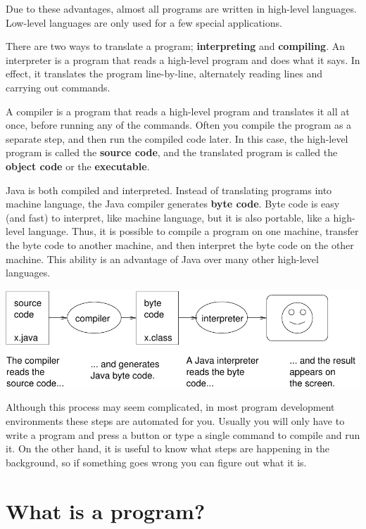 \documentclass[12pt]{book}
\theoremstyle{exercise}
\begin{document}
Due to these advantages, almost all programs are written in
high-level languages.  Low-level languages are only used for
a few special applications.


There are two ways to translate a program;
{\bf interpreting} and {\bf compiling}.  An interpreter
is a program that reads a high-level program
and does what it says.  In effect, it translates
the program line-by-line, alternately reading lines and
carrying out commands.

A compiler is a program that reads a high-level program and
translates it all at once, before running any of the commands.
Often you compile the program as a separate step, and then
run the compiled code later.  In this case, the high-level
program is called the {\bf source code}, and the translated
program is called the {\bf object code} or the {\bf executable}.

Java is both compiled and
interpreted.  Instead of translating programs into
machine language, the Java compiler generates {\bf byte code}.
Byte code is easy (and fast) to interpret, like machine language,
but it is also portable, like a high-level language.  Thus,
it is possible to compile a program on one machine,
transfer the byte code to another machine,
and then interpret the byte code on the other machine.  This
ability is an advantage of Java over many other
high-level languages.


\includegraphics{figs/java.pdf}


Although this process may seem complicated, in most program
development environments these steps
are automated for you.  Usually you will only have to write a program
and press a button or type a single command to compile and run it.  On
the other hand, it is useful to know what steps are
happening in the background, so if something goes wrong you can
figure out what it is.



\section{What is a program?}
\end{document}
